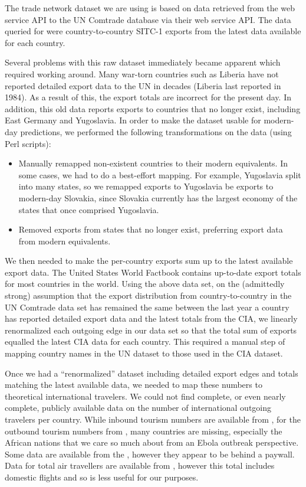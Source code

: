 \documentclass[10pt, journal,onecolumn]{IEEEtran}
\begin{document}
The trade network dataset we are using is based on data retrieved from the web service API to the
UN Comtrade database \citep{uncomtradedata} via their web service API.
The data queried for were country-to-country SITC-1 exports from the latest data available
for each country.

Several problems with this raw dataset immediately became apparent which required working around.
Many war-torn countries such as Liberia have not reported detailed export data
to the UN in decades (Liberia last reported in 1984). As a result of this, the export totals
are incorrect for the present day. In addition, this old data reports exports to countries that
no longer exist, including East Germany and Yugoslavia. In order to make the dataset usable for
modern-day predictions, we performed the following transformations on the data (using Perl scripts):

\begin{itemize}
\item Manually remapped non-existent countries to their modern equivalents.
      In some cases, we had to do a best-effort mapping. For example, Yugoslavia split into many
      states, so we remapped exports to Yugoslavia be exports to modern-day Slovakia,
      since Slovakia currently has the largest economy of the states that once comprised Yugoslavia.
\item Removed exports from states that no longer exist, preferring export data from
      modern equivalents.
\end{itemize}

We then needed to make the per-country exports sum up to the latest available export data.
The United States \cite{ciatotalexports} World Factbook contains up-to-date export totals
for most countries in the world. Using the above data set, on the (admittedly strong) assumption
that the export distribution
from country-to-country in the UN Comtrade data set has remained the same between the last year a
country has reported detailed export data and the latest totals from the CIA, we linearly renormalized
each outgoing edge in our data set so that the total sum of exports equalled the latest CIA data
for each country.
This required a manual step of mapping country names in the UN dataset to those used in
the CIA dataset.

Once we had a ``renormalized'' dataset including detailed export edges and totals matching
the latest available data, we needed to map these numbers to theoretical international travelers.
We could not find complete, or even nearly complete, publicly available data on the number of
international outgoing travelers per country. While inbound tourism numbers are available from
\cite{worldbankinboundtourism}, for the outbound tourism numbers from \cite{worldbankoutboundtourism},
many countries are missing,
especially the African nations that we care so much about from an Ebola outbreak perspective.
Some data are available from the \cite{unwtooutboundtourism}, however they appear to be behind a paywall.
Data for total air travellers are available from \cite{worldbankairpassengers},
however this total includes domestic flights and so is less useful for our purposes.
\end{document}
